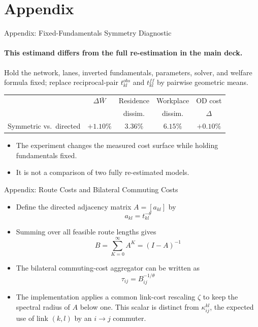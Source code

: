 \documentclass[11pt,aspectratio=169]{beamer}
\newcommand{\good}[1]{\textcolor{blue!70!black}{#1}}
\newcommand{\navback}[1]{\par\vspace{0.35em}\noindent\hfill\hyperlink{#1}{\beamerreturnbutton{back}}}
\begin{document}
\section{Appendix}
\begin{frame}[label=appsymfixed]{Appendix: Fixed-Fundamentals Symmetry Diagnostic}
\framesubtitle{This estimand differs from the full re-estimation in the main deck.}
\footnotesize
Hold the network, lanes, inverted fundamentals, parameters, solver, and welfare formula fixed; replace reciprocal-pair $t_{kl}^{obs}$ and $t_{kl}^{ff}$ by pairwise geometric means.
\vspace{0.45em}
\begin{center}
\scriptsize
\begin{tabular}{lcccc}
\toprule
 & $\Delta\bar W$ & Residence & Workplace & OD cost \\
 &  & dissim. & dissim. & $\Delta$ \\
\midrule
Symmetric vs.\ directed & \good{$+1.10\%$} & $3.36\%$ & $6.15\%$ & $+0.10\%$ \\
\bottomrule
\end{tabular}
\end{center}
\vspace{0.35em}
\begin{itemize}\footnotesize
  \item The experiment changes the measured cost surface while holding fundamentals fixed.
  \item It is not a comparison of two fully re-estimated models.
\end{itemize}
\end{frame}

\begin{frame}[label=approute]{Appendix: Route Costs and Bilateral Commuting Costs}
\begin{itemize}\small
  \item Define the directed adjacency matrix $A=[a_{kl}]$ by
  \vspace{-0.5em}\begin{equation}
    a_{kl} = t_{kl}^{-\theta}
  \end{equation}
  \item Summing over all feasible route lengths gives
  \vspace{-0.5em}\begin{equation}
    B = \sum_{K=0}^{\infty}A^K = (I-A)^{-1}
  \end{equation}
  \item The bilateral commuting-cost aggregator can be written as
  \vspace{-0.5em}\begin{equation}\label{eq:inverse}
    \tau_{ij} = B_{ij}^{-1/\theta}
  \end{equation}
  \vspace{-0.5em}
  \item The implementation applies a common link-cost rescaling $\zeta$ to keep the spectral radius of $A$ below one. This scalar is distinct from $\kappa_{ij}^{kl}$, the expected use of link $(k,l)$ by an $i\to j$ commuter.
\end{itemize}
\navback{bilateral}
\end{frame}
\end{document}
